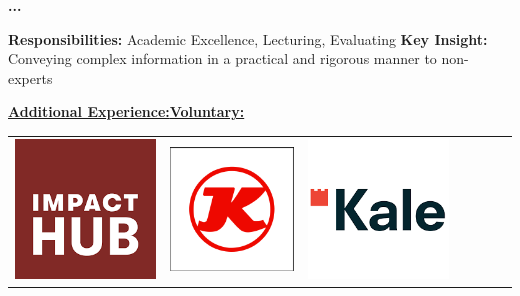 \documentclass[10pt,a4paper]{altacv}
\begin{document}
 \textbf{...}

\textbf{Responsibilities:} Academic Excellence, Lecturing, Evaluating \newline
\textbf{Key Insight:} Conveying complex information in a practical and rigorous manner to non-experts
\begin{center}
    \hspace{25pt}\underline{\textbf{Additional Experience:}}\hspace{125pt}\underline{\textbf{Voluntary:}}\newline\divider
    {
    \renewcommand{\arraystretch}{2}
    \begin{tabular}{ |c c c c c|c c| } \hline
 {\href{https://impacthubist.net}{\includegraphics[scale=0.15]{hub.png}}}
 &{\href{https://www.kaessbohrer.com/en}{\includegraphics[scale=0.17]{kass.png}}}
 &{\href{http://www.kale.com.tr/en}{\includegraphics[scale=0.17]{kale.png}}}

\end{tabular}}
\end{center}
\end{document}
